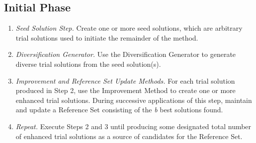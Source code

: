 \subsection{Initial Phase}
\begin{enumerate}
\item \textit{Seed Solution Step.}
  Create one or more seed solutions,
  which are
  arbitrary trial solutions
  used to
  initiate
  the remainder of the method.
\item \textit{Diversification Generator.}
  Use the Diversification Generator
  to generate
  diverse trial solutions
  from the seed solution(s).
\item \textit{Improvement and Reference Set Update Methods.}
  For each trial solution
  produced in Step 2,
  use the Improvement Method
  to create one or more enhanced trial solutions.
  During successive applications of this step,
  maintain and update
  a Reference Set
  consisting of the \textit{b} best solutions found.
\item \textit{Repeat.}
  Execute Steps 2 and 3
  until
  producing some designated
  total number of enhanced trial solutions
  as a source of candidates
  for the Reference Set.
\end{enumerate}
